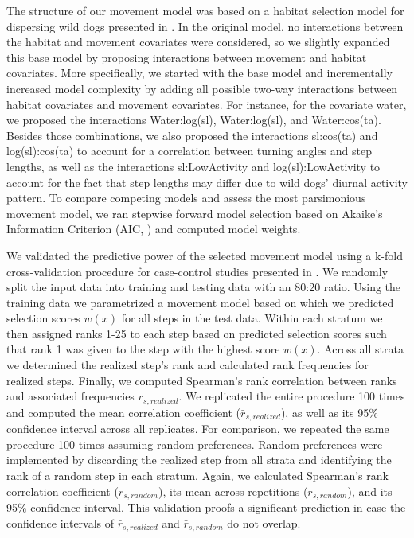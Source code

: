 \documentclass[abstract=on,10pt,a4paper,bibliography=totocnumbered]{article}
\begin{document}
The structure of our movement model was based on a habitat selection model for
dispersing wild dogs presented in \cite{Hofmann.2021}. In the original model, no
interactions between the habitat and movement covariates were considered, so we
slightly expanded this base model by proposing interactions between movement and
habitat covariates. More specifically, we started with the base model and
incrementally increased model complexity by adding all possible two-way
interactions between habitat covariates and movement covariates. For instance,
for the covariate \textsf{water}, we proposed the interactions
\textsf{Water:log(sl)}, \textsf{Water:log(sl)}, and \textsf{Water:cos(ta)}.
Besides those combinations, we also proposed the interactions
\textsf{sl:cos(ta)} and \textsf{log(sl):cos(ta)} to account for a correlation
between turning angles and step lengths, as well as the interactions
\textsf{sl:LowActivity} and \textsf{log(sl):LowActivity} to account for the fact
that step lengths may differ due to wild dogs' diurnal activity pattern. To
compare competing models and assess the most parsimonious movement model, we ran
stepwise forward model selection based on Akaike's Information Criterion (AIC,
\citealp{Burnham.2002}) and computed model weights.

We validated the predictive power of the selected movement model using a k-fold
cross-validation procedure for case-control studies presented in
\cite{Fortin.2009}. We randomly split the input data into training and testing
data with an 80:20 ratio. Using the training data we parametrized a movement
model based on which we predicted selection scores \(w(x)\) for all steps in the
test data. Within each stratum we then assigned ranks 1-25 to each step based on
predicted selection scores such that rank 1 was given to the step with the
highest score \(w(x)\). Across all strata we determined the realized step's rank
and calculated rank frequencies for realized steps. Finally, we computed
Spearman's rank correlation between ranks and associated frequencies \(r_{s,
realized}\). We replicated the entire procedure 100 times and computed the mean
correlation coefficient (\(\bar{r}_{s, realized}\)), as well as its 95\%
confidence interval across all replicates. For comparison, we repeated the same
procedure 100 times assuming random preferences. Random preferences were
implemented by discarding the realized step from all strata and identifying the
rank of a random step in each stratum. Again, we calculated Spearman's rank
correlation coefficient (\(r_{s, random}\)), its mean across repetitions
(\(\bar{r}_{s, random}\)), and its 95\% confidence interval. This validation
proofs a significant prediction in case the confidence intervals of
\(\bar{r}_{s, realized}\) and \(\bar{r}_{s, random}\) do not overlap.
\end{document}
